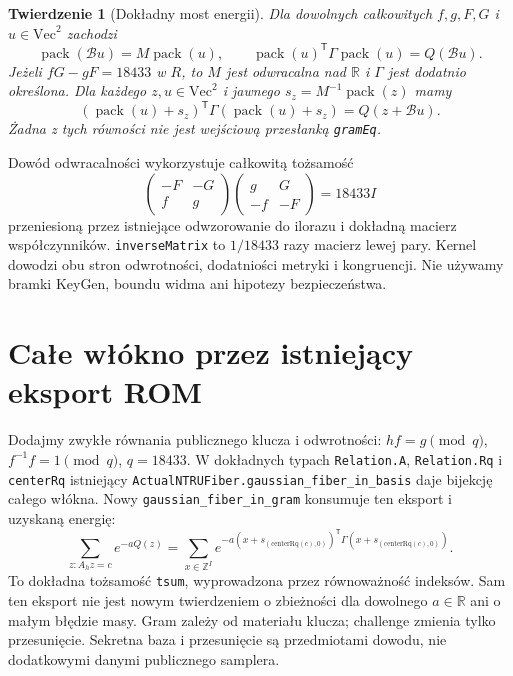 \documentclass[11pt,a4paper]{article}
\newcommand{\code}[1]{\nolinkurl{#1}}
\newtheorem{theorem}{Twierdzenie}
\begin{document}
\begin{theorem}[Dokładny most energii]
Dla dowolnych całkowitych $f,g,F,G$ i $u\in\mathrm{Vec}^2$ zachodzi
\[
 \operatorname{pack}(\mathcal B u)=M\operatorname{pack}(u),\qquad
 \operatorname{pack}(u)^{\mathsf T}\Gamma\operatorname{pack}(u)=Q(\mathcal B u).
\]
Jeżeli $fG-gF=18433$ w $R$, to $M$ jest odwracalna nad $\mathbb R$
i $\Gamma$ jest dodatnio określona. Dla każdego $z,u\in\mathrm{Vec}^2$
i jawnego $s_z=M^{-1}\operatorname{pack}(z)$ mamy
\[
 (\operatorname{pack}(u)+s_z)^{\mathsf T}\Gamma
   (\operatorname{pack}(u)+s_z)=Q(z+\mathcal B u).
\]
Żadna z tych równości nie jest wejściową przesłanką \code{gramEq}.
\end{theorem}
Dowód odwracalności wykorzystuje całkowitą tożsamość
\[
 \begin{pmatrix}-F&-G\\ f&g\end{pmatrix}
 \begin{pmatrix}g&G\\-f&-F\end{pmatrix}=18433I
\]
przeniesioną przez istniejące odwzorowanie do ilorazu i dokładną macierz
współczynników. \code{inverseMatrix} to $1/18433$ razy macierz lewej pary.
Kernel dowodzi obu stron odwrotności, dodatniości metryki i kongruencji.
Nie używamy bramki KeyGen, boundu widma ani hipotezy bezpieczeństwa.

\section{Całe włókno przez istniejący eksport ROM}
Dodajmy zwykłe równania publicznego klucza i odwrotności:
$hf=g\pmod q$, $f^{-1}f=1\pmod q$, $q=18433$. W dokładnych typach
\code{Relation.A}, \code{Relation.Rq} i \code{centerRq} istniejący
\code{ActualNTRUFiber.gaussian_fiber_in_basis} daje bijekcję całego włókna.
Nowy \code{gaussian_fiber_in_gram} konsumuje ten eksport i uzyskaną energię:
\[
 \sum_{z:A_hz=c}e^{-aQ(z)}=
 \sum_{x\in\mathbb Z^I}
 e^{-a(x+s_{(\mathrm{centerRq}(c),0)})^{\mathsf T}
          \Gamma(x+s_{(\mathrm{centerRq}(c),0)})}.
\]
To dokładna tożsamość \code{tsum}, wyprowadzona przez równoważność indeksów.
Sam ten eksport nie jest nowym twierdzeniem o zbieżności dla dowolnego
$a\in\mathbb R$ ani o małym błędzie masy. Gram zależy od materiału klucza;
challenge zmienia tylko przesunięcie. Sekretna baza i przesunięcie są
przedmiotami dowodu, nie dodatkowymi danymi publicznego samplera.
\end{document}
